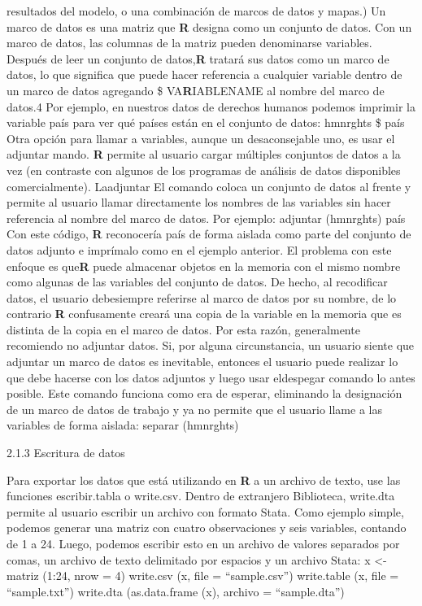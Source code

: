 \documentclass[
]{book}
\begin{document}
resultados del modelo, o una combinación de marcos de datos y mapas.) Un marco de datos es una matriz que
\textbf{R} designa como un conjunto de datos. Con un marco de datos, las columnas de la matriz pueden denominarse variables. Después de leer un conjunto de datos,\textbf{R} tratará sus datos como un marco de datos, lo que significa que puede hacer referencia a cualquier variable dentro de un marco de datos agregando
\$ VA\textbf{R}IABLENAME al nombre del marco de datos.4 Por ejemplo, en nuestros datos de derechos
humanos podemos imprimir la variable país para ver qué países están en el conjunto de datos:
hmnrghts \$ país
Otra opción para llamar a variables, aunque un desaconsejable uno, es usar el adjuntar mando. \textbf{R} permite al usuario cargar múltiples conjuntos de datos a la vez (en contraste con algunos de los programas de análisis de datos disponibles comercialmente). Laadjuntar
El comando coloca un conjunto de datos al frente y permite al usuario llamar directamente los nombres de las variables sin hacer referencia al nombre del marco de datos. Por ejemplo:
adjuntar (hmnrghts)
país
Con este código, \textbf{R} reconocería país de forma aislada como parte del conjunto de datos adjunto e imprímalo como en el ejemplo anterior. El problema con este enfoque es que\textbf{R} puede almacenar objetos en la memoria con el mismo nombre como algunas de las variables del conjunto de datos. De hecho, al recodificar datos, el usuario debesiempre referirse al marco de datos por su nombre, de lo contrario \textbf{R} confusamente creará una copia de la variable en la memoria que es distinta de la copia en el marco de datos. Por esta razón, generalmente recomiendo no adjuntar datos. Si, por alguna circunstancia, un usuario siente que adjuntar un marco de datos es inevitable, entonces el usuario puede realizar lo que debe hacerse con los datos adjuntos y luego usar eldespegar comando lo antes posible. Este comando funciona como era de esperar, eliminando la designación de un marco de datos de trabajo y ya no permite que el usuario llame a las variables de forma aislada:
separar (hmnrghts)

2.1.3 Escritura de datos

Para exportar los datos que está utilizando en \textbf{R} a un archivo de texto, use las funciones escribir.tabla o write.csv. Dentro de extranjero Biblioteca, write.dta permite al usuario escribir un archivo con formato Stata. Como ejemplo simple, podemos generar una matriz con cuatro observaciones y seis variables, contando de 1 a 24. Luego, podemos escribir esto en un archivo de valores separados por comas, un archivo de texto delimitado por espacios y un archivo Stata:
x \textless- matriz (1:24, nrow = 4) write.csv (x, file = ``sample.csv'') write.table (x, file = ``sample.txt'') write.dta (as.data.frame (x), archivo = ``sample.dta'')
\end{document}
